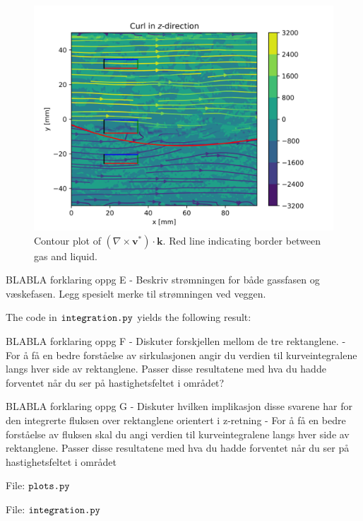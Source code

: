 \documentclass[a4paper,10pt,english]{article}
\begin{document}
\begin{figure}[h!]
    \centering
    \includegraphics[scale=0.65]{../figures/task_e.png}
    \caption{Contour plot of $(\nabla \times \bm{v}^*) \cdot \bm{k}$. Red line indicating border between gas and liquid.}
    \label{fig:contour_e}
\end{figure}

BLABLA forklaring oppg E
- Beskriv strømningen for både gassfasen og væskefasen. Legg spesielt merke til strømningen ved veggen.

\newpage
The code in $\verb|integration.py|$ yields the following result:


\newpage
BLABLA forklaring oppg F
- Diskuter forskjellen mellom de tre rektanglene.
- For å få en bedre forståelse av sirkulasjonen angir du verdien til kurveintegralene langs hver side av rektanglene. Passer disse resultatene med hva du hadde forventet når du ser på hastighetsfeltet i området?


BLABLA forklaring oppg G
- Diskuter hvilken implikasjon disse svarene har for den integrerte fluksen over rektanglene orientert i z-retning
- For å få en bedre forståelse av fluksen skal du angi verdien til kurveintegralene langs hver side av rektanglene. Passer disse resultatene med hva du hadde forventet når du ser på hastighetsfeltet i området


\newpage
File: $\verb|plots.py|$


File: $\verb|integration.py|$

\end{document}
